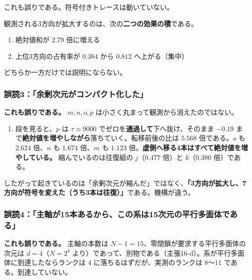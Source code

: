\documentclass[
  10pt,
]{ltjsarticle}
\providecommand{\tightlist}{%
  \setlength{\itemsep}{0pt}\setlength{\parskip}{0pt}}
\begin{document}
これも誤りである。符号付きトレースは動いていない。

観測される3方向が拡大するのは、次の\textbf{二つの効果の積}である。

\begin{enumerate}
\def\labelenumi{\arabic{enumi}.}
\tightlist
\item
  絶対値和が \(2.79\) 倍に増える
\item
  上位3方向の占有率が \(0.384\) から \(0.812\) へ上がる（集中）
\end{enumerate}

どちらか一方だけでは説明にならない。

\subsubsection{誤読3：「余剰次元がコンパクト化した」}\label{ux8aa4ux8aad3ux4f59ux5270ux6b21ux5143ux304cux30b3ux30f3ux30d1ux30afux30c8ux5316ux3057ux305f}

\textbf{これも誤りである。} \(m, n, o, p\)
は小さく丸まって観測から消えたのではない。

\begin{enumerate}
\def\labelenumi{(\alph{enumi})}
\setcounter{enumi}{3}
\tightlist
\item
  段を見ると、\(p\) は \(\tau \approx 9000\)
  でゼロを\textbf{通過して}下へ抜け、そのまま \(-0.19\)
  まで\textbf{絶対値を増やしながら}落ちていく。転移前後の比は \(5.568\)
  倍である。\(o\) も \(2.624\) 倍、\(n\) も \(1.674\) 倍、\(m\) も
  \(1.123\) 倍。\textbf{虚側へ移る4本はすべて絶対値を増やしている。}
  縮んでいるのは往復組の \(j\)（\(0.477\) 倍）と \(k\)（\(0.380\)
  倍）である。
\end{enumerate}

したがって起きているのは「余剰次元が縮んだ」ではなく、\textbf{「3方向が拡大し、7方向が符号を変えた（うち3本は往復）」}である。機構が違う。

\subsubsection{誤読4：「主軸が15本あるから、この系は15次元の平行多面体である」}\label{ux8aa4ux8aad4ux4e3bux8ef8ux304c15ux672cux3042ux308bux304bux3089ux3053ux306eux7cfbux306f15ux6b21ux5143ux306eux5e73ux884cux591aux9762ux4f53ux3067ux3042ux308b}

\textbf{これも誤りである。} 主軸の本数は
\(N-1 = 15\)、零閉鎖が要求する平行多面体の次元は \(d = 4\)（\(N = 2^4\)
より）であって、別物である（主張16-d）。系が平行多面体に到達したならランクは
\(4\) に落ちるはずだが、実測のランクは 8〜11 である。到達していない。
\end{document}
